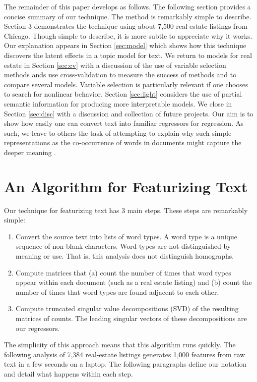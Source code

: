 \documentclass[12pt]{article}
\begin{document}
 The remainder of this paper develops as follows.  The following section
 provides a concise summary of our technique.  The method is remarkably simple
 to describe.  Section 3 demonstrates the technique using about 7,500 real
 estate listings from Chicago.  Though simple to describe, it is more subtle to
 appreciate why it works.  Our explanation appears in Section \ref{sec:model} which shows how this technique discovers the latent effects in a topic model for text.  We return to models for real estate in Section \ref{sec:cv} with a discussion of the use of variable selection methods ands use cross-validation to measure the success of methods and to compare several models.  Variable selection is particularly relevant if one chooses to search for nonlinear behavior.  Section \ref{sec:light} considers the use of partial semantic information for producing more interpretable models.  We close in Section \ref{sec:disc} with a discussion and collection of future projects.  Our aim is to show how easily one can convert text into familiar regressors for regression.  As such, we leave to others the task of attempting to explain why such simple representations as the co-occurrence of words in documents might capture the deeper meaning  \citep{deerwester90, landauer97, bullinaria07, turney10}. 


\section{An Algorithm for Featurizing Text}
\label{sec:algo}

 Our technique for featurizing text has 3 main steps.  These steps are
 remarkably simple:
 \begin{enumerate}
   \item Convert the source text into lists of word types.  A word type is a
 unique sequence of non-blank characters.  Word types are not distinguished by meaning or use.  That is, this analysis does not distinguish homographs.
   \item Compute matrices that (a) count the number of times that word types
 appear within each document (such as a real estate listing) and (b) count the number of times that word types are found adjacent to each other.
   \item Compute truncated singular value decompositions (SVD) of the resulting
 matrices of counts. The leading singular vectors of these decompositions are our regressors.
 \end{enumerate}
   The simplicity of this approach means that this algorithm runs quickly.  The following analysis of 7,384 real-estate listings generates 1,000 features from raw text in a few seconds on a laptop.  The following paragraphs define our notation and detail what happens within each step. 
\end{document}
